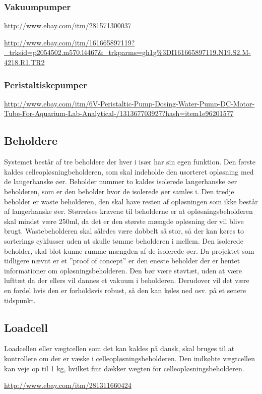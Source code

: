 \subsubsection{Vakuumpumper}
\url{ http://www.ebay.com/itm/281571300037}

\url{http://www.ebay.com/itm/161665897119?_trksid=p2054502.m570.l4467&_trkparms=gh1g%3DI161665897119.N19.S2.M-4218.R1.TR2}

\subsubsection{Peristaltiskepumper}

\url{http://www.ebay.com/itm/6V-Peristaltic-Pump-Dosing-Water-Pump-DC-Motor-Tube-For-Aquarium-Lab-Analytical-/131367703927?hash=item1e96201577}


\subsection{Beholdere}
Systemet består af tre beholdere der hver i især har sin egen funktion. Den første kaldes celleopløsningbeholderen, som skal indeholde den usorteret opløsning med de langerhanske øer. Beholder nummer to kaldes isolerede langerhanske øer beholderen, som er den beholder hvor de isolerede øer samles i. Den tredje beholder er waste beholderen, den skal have resten af opløsningen som ikke består af langerhanske øer. Størrelses kravene til beholderne er at opløsningsbeholderen skal mindst være 250ml, da det er den største mængde opløsning der vil blive brugt. Wastebeholderen skal således være dobbelt så stor, så der kan køres to sorterings cyklusser uden at skulle tømme beholderen i mellem. Den isolerede beholder, skal blot kunne rumme mængden af de isolerede øer. Da projektet som tidligere nævnt er et ”proof of concept” er den eneste beholder der er hentet informationer om opløsningsbeholderen. Den bør være støvtæt, uden at være lufttæt da der ellers vil dannes et vakuum i beholderen. Derudover vil det være en fordel hvis den er forholdsvis robust, så den kan køles ned osv. på et senere tidspunkt.

\subsection{Loadcell}
Loadcellen eller vægtcellen som det kan kaldes på dansk, skal bruges til at kontrollere om der er væske i celleopløsningsbeholderen. Den indkøbte vægtcellen kan veje op til 1 kg, hvilket fint dækker vægten for celleopløsningsbeholderen.

\url{http://www.ebay.com/itm/281311660424}

